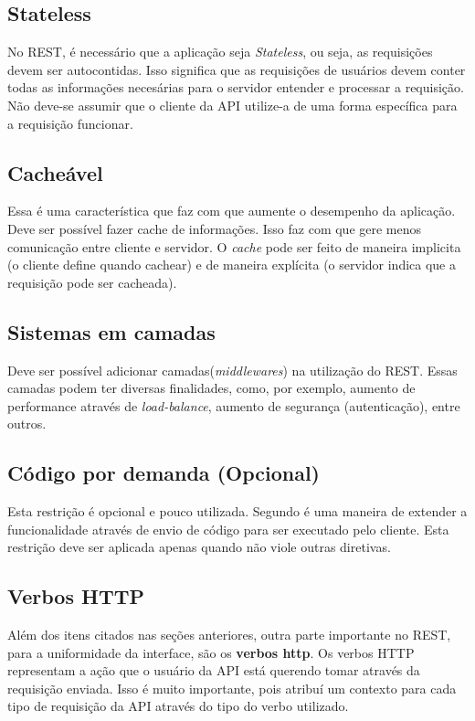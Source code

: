 \subsection{Stateless}

No REST, é necessário que a aplicação seja \textit{Stateless}, ou seja, as requisições
devem ser autocontidas. Isso significa que as requisições de usuários devem conter todas
as informações necesárias para o servidor entender e processar a requisição. Não deve-se
assumir que o cliente da API utilize-a de uma forma específica para a requisição funcionar.

\subsection{Cacheável}

Essa é uma característica que faz com que aumente o desempenho da aplicação. Deve ser
possível fazer cache de informações. Isso faz com que gere menos comunicação entre
cliente e servidor. O \textit{cache} pode ser feito de maneira implicita (o cliente
define quando cachear) e de maneira explícita (o servidor indica que a requisição pode
ser cacheada).

\subsection{Sistemas em camadas}

Deve ser possível adicionar camadas(\textit{middlewares}) na utilização do REST.
Essas camadas podem ter diversas finalidades, como, por exemplo, aumento de performance
através de \textit{load-balance}, aumento de segurança (autenticação), entre outros.

\subsection{Código por demanda (Opcional)}

Esta restrição é opcional e pouco utilizada. Segundo \cite{todd} é uma maneira de
extender a funcionalidade através de envio de código para ser executado pelo cliente.
Esta restrição deve ser aplicada apenas quando não viole outras diretivas.

\subsection{Verbos HTTP}

Além dos itens citados nas seções anteriores, outra parte importante no REST,
para a uniformidade da interface, são os \textbf{verbos http}. Os verbos
HTTP representam a ação que o usuário da API está querendo tomar através da
requisição enviada. Isso é muito importante, pois atribuí um contexto para cada
tipo de requisição da API através do tipo do verbo utilizado.

